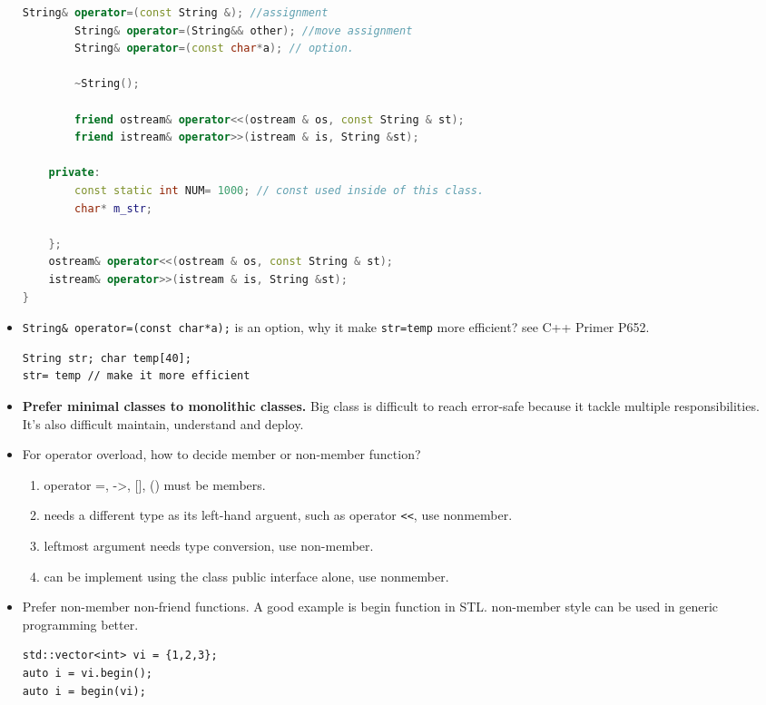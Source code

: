 \documentclass[a4paper,11pt,twoside]{book}
\begin{document}
\begin{itemize}
\begin{lstlisting}[frame=single, language=c++]
		String& operator=(const String &); //assignment
		String& operator=(String&& other); //move assignment
		String& operator=(const char*a); // option.
		
		~String();  
		
		friend ostream& operator<<(ostream & os, const String & st);
		friend istream& operator>>(istream & is, String &st);
		
	private:
		const static int NUM= 1000; // const used inside of this class.
		char* m_str;
		
	};
	ostream& operator<<(ostream & os, const String & st);
	istream& operator>>(istream & is, String &st);
}
\end{lstlisting}

        \item \texttt{String\& operator=(const char*a);} is an option, why it make \texttt{str=temp} more efficient? see C++ Primer P652.
	
\begin{lstlisting}[numbers=none]
String str; char temp[40];
str= temp // make it more efficient
\end{lstlisting}
	
	
    \item \textbf{Prefer minimal classes to monolithic classes.} Big class is difficult to reach error-safe because it tackle multiple responsibilities. It's also difficult maintain, understand and deploy.

	\item For operator overload, how to decide member or non-member function?
	\begin{enumerate}
		\item operator =, ->, [], () must be members.
		\item needs a different type as its left-hand arguent, such as operator \verb=<<=, use nonmember.
		\item leftmost argument needs type conversion, use non-member.
		\item can be implement using the class public interface alone, use nonmember.
	\end{enumerate}

	\item Prefer non-member non-friend functions. A good example is begin function in STL. non-member style can be used in generic programming better.  

\begin{lstlisting}[numbers=none]
std::vector<int> vi = {1,2,3};
auto i = vi.begin();
auto i = begin(vi);
\end{lstlisting}


\end{itemize}
\end{document}
